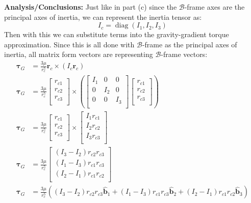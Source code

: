 \documentclass[titlepage]{article}
\newcommand{\diag}{\operatorname{diag}}
\begin{document}
\textbf{Analysis/Conclusions:}
Just like in part (c) since the $\mathcal{B}$-frame axes are the principal axes of inertia, we can represent the inertia tensor as:
\begin{equation}
	I_c = \diag(I_1,I_2,I_3)
\end{equation}
Then with this we can substitute terms into the gravity-gradient torque approximation. Since this is all done with $\mathcal{B}$-frame as the principal axes of inertia, all matrix form vectors are representing $\mathcal{B}$-frame vectors:
\begin{equation}
	\begin{split}
		\boldsymbol{\tau}_G&=\frac{3\mu}{r_c^5}\boldsymbol{r}_c\times(I_c\boldsymbol{r}_c)\\
		\boldsymbol{\tau}_G&=\frac{3\mu}{r_c^5}
		\begin{bmatrix}
			r_{c1} \\
			r_{c2} \\
			r_{c3} \\
		\end{bmatrix}\times\left(
		\begin{bmatrix}
			I_1 & 0 & 0 \\
			0 & I_2 & 0 \\
			0 & 0 & I_3 \\
		\end{bmatrix}
		\begin{bmatrix}
			r_{c1} \\
			r_{c2} \\
			r_{c3} \\
		\end{bmatrix}\right) \\
		\boldsymbol{\tau}_G&=\frac{3\mu}{r_c^5}
		\begin{bmatrix}
			r_{c1} \\
			r_{c2} \\
			r_{c3} \\
		\end{bmatrix}\times
		\begin{bmatrix}
			I_1r_{c1} \\
			I_2r_{c2} \\
			I_3r_{c3} \\
		\end{bmatrix} \\
		\boldsymbol{\tau}_G&=\frac{3\mu}{r_c^5}
		\begin{bmatrix}
			\left(I_3-I_2\right)r_{c2}r_{c3} \\
			\left(I_1-I_3\right)r_{c1}r_{c3} \\
			\left(I_2-I_1\right)r_{c1}r_{c2} \\
		\end{bmatrix} \\
		\boldsymbol{\tau}_G&=\frac{3\mu}{r_c^5}\left(\left(I_3-I_2\right)r_{c2}r_{c3}\hat{\boldsymbol{b}}_1+\left(I_1-I_3\right)r_{c1}r_{c3}\hat{\boldsymbol{b}}_2+\left(I_2-I_1\right)r_{c1}r_{c2}\hat{\boldsymbol{b}}_3\right) \\
	\end{split}
\end{equation}
\end{document}
